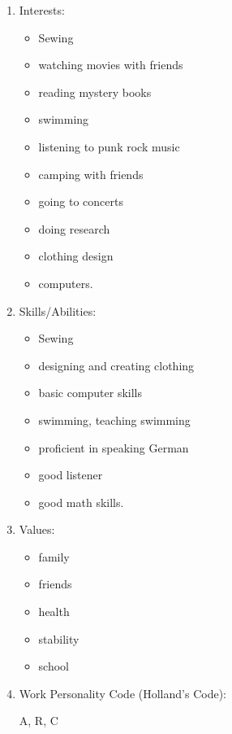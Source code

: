 \begin{enumerate}[leftmargin=1cm]
	      \pagebreak \item Interests:
	      \begin{multicols}{2}\begin{itemize}
			      \item Sewing
			      \item watching movies with friends
			      \item reading mystery books
			      \item swimming
			      \item listening to punk rock music
			      \item camping with friends
			      \item going to concerts
			      \item doing research
			      \item clothing design
			      \item computers.
		      \end{itemize}\end{multicols}
	\item Skills/Abilities:
	      \begin{multicols}{2}\begin{itemize}
			      \item Sewing
			      \item designing and creating clothing
			      \item basic computer skills
			      \item swimming, teaching swimming
			      \item proficient in speaking German
			      \item good listener
			      \item good math skills.
		      \end{itemize}\end{multicols}
	\item Values:
	      \begin{multicols}{2}\begin{itemize}
			      \item family
			      \item friends
			      \item health
			      \item stability
			      \item school\end{itemize}\end{multicols}
	\item Work Personality Code (Holland's Code):

	      A, R, C
\end{enumerate}

